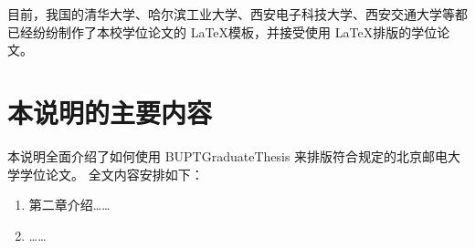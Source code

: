 目前，我国的清华大学、哈尔滨工业大学、西安电子科技大学、西安交通大学等都已经纷纷制作了本校学位论文的 \LaTeX 模板，并接受使用 \LaTeX 排版的学位论文。

\section{本说明的主要内容}
本说明全面介绍了如何使用 BUPTGraduateThesis 来排版符合\parencite{BUPT_Thesis_Format_2014}规定的北京邮电大学学位论文。
全文内容安排如下：

\begin{enumerate}
\item 第二章介绍……
\item ……
\end{enumerate}

\chapterbib

